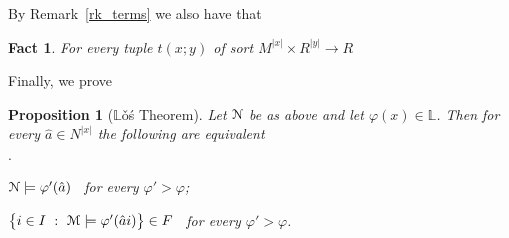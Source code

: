 \documentclass[12pt,letterpaper,oneside,reqno]{amsart}
\newcommand{\mylabel}[1]{{#1}\hfill}
\renewenvironment{itemize}
  {\begin{list}{$\cdot$}{%
   \setlength{\parskip}{0mm}
   \setlength{\topsep}{.2\baselineskip}
   \setlength{\rightmargin}{0mm}
   \setlength{\listparindent}{0mm}
   \setlength{\itemindent}{0mm}
   \setlength{\labelwidth}{3ex}
   \setlength{\itemsep}{.2\baselineskip}
   \setlength{\parsep}{.2\baselineskip}
   \setlength{\partopsep}{0mm}
   \setlength{\labelsep}{1ex}
   \setlength{\leftmargin}{\labelwidth+\labelsep}
   \let\makelabel\mylabel}}{%
   \end{list}}
\theoremstyle{plain}
\newtheorem{proposition}[theorem]{Proposition}
\newtheorem{fact}[theorem]{Fact}
\theoremstyle{remark}
\begin{document}
By Remark~\ref{rk_terms} we also have that

\begin{fact}\label{fact_termini2}
  For every tuple $t(x;y)$ of sort $M^{|x|}\times R^{|y|}\to R$
  
  \hfill\qedsymbol
\end{fact}

Finally, we prove


\begin{proposition}[$\mathds{L}$\v{o}\'s Theorem]\label{thm_Los}
  Let ${\EuScript N}$ be as above and let $\varphi(x)\in\mathds{L}$.
  Then for every $\hat a\in N^{|x|}$ the following are equivalent
  \begin{itemize}
    \item  ${\EuScript N}\models\varphi'(\hat a)$ \ for every $\varphi'>\varphi$;
    \item $\big\{ i\in I\ :\ {\EuScript M}\models\varphi'(\hat ai)\big\}\in F$ \ for every $\varphi'>\varphi$.
  \end{itemize}
\end{proposition}
\end{document}
